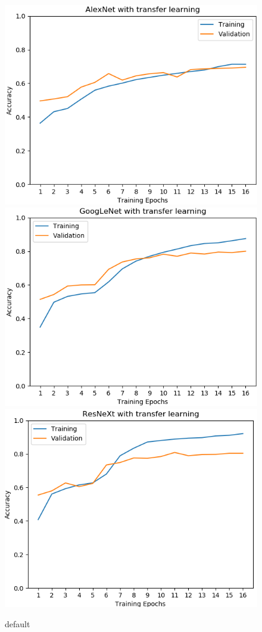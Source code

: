 \documentclass{article}
\begin{document}
\begin{figure}[htp]
	
	\centering
	\includegraphics[width=.33\textwidth]{graphs/alex_training}\hfill
	\includegraphics[width=.33\textwidth]{graphs/google_training}\hfill
	\includegraphics[width=.33\textwidth]{graphs/res_training}
	
	\caption{default}
	\label{fig:figure3}
	
\end{figure}
\end{document}

